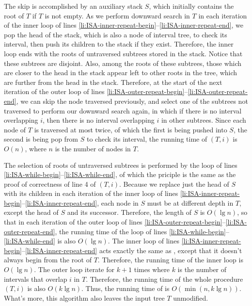\documentclass[a4paper, fleqn]{article}
\begin{document}
The skip is accomplished by an auxiliary stack $S$, which initially
contains the root of $T$ if $T$ is not empty. As we perform downward
search in $T$ in each iteration of the inner  loop of lines
\ref{li:ISA-inner-repeat-begin}--\ref{li:ISA-inner-repeat-end}, we pop
the head of the stack, which is also a node of interval tree, to check
its interval, then push its children to the stack if they
exist. Therefore, the inner  loop ends with the roots of
untraversed subtrees stored in the stack. Notice that these subtrees
are disjoint. Also, among the roots of these subtrees, those which are
closer to the head in the stack appear left to other roots in the
tree, which are further from the head in the stack. Therefore, at the
start of the next iteration of the outer  loop of lines
\ref{li:ISA-outer-repeat-begin}--\ref{li:ISA-outer-repeat-end}, we can
skip the node traversed previously, and select one of the subtrees not
traversed to perform our downward search again, in which if there is
no interval overlapping $i$, then there is no interval overlapping $i$
in other subtrees. Since each node of $T$ is traversed at most twice,
of which the first is being pushed into $S$, the second is being pop
from $S$ to check its interval, the running time of
$(T,i)$ is $O(n)$, where $n$ is the number
of nodes in $T$.

The selection of roots of untraversed subtrees is performed by the
 loop of lines
\ref{li:ISA-while-begin}--\ref{li:ISA-while-end}, of which the
priciple is the same as the proof of correctness of line 4 of
$(T,i)$. Because we replace just the head of $S$
with its children in each iteration of the inner  loop of
lines \ref{li:ISA-inner-repeat-begin}--\ref{li:ISA-inner-repeat-end},
each node in $S$ must be at different depth in $T$, except the head of
$S$ and its successor. Therefore, the length of $S$ is $O(\lg n)$, so
that in each iteration of the outer  loop of lines
\ref{li:ISA-outer-repeat-begin}--\ref{li:ISA-outer-repeat-end}, the
running time of the  loop of lines
\ref{li:ISA-while-begin}--\ref{li:ISA-while-end} is also $O(\lg
n)$. The inner  loop of lines
\ref{li:ISA-inner-repeat-begin}--\ref{li:ISA-inner-repeat-end} acts
exactly the same as , except that it doesn't
always begin from the root of $T$. Therefore, the running time of the
inner  loop is $O(\lg n)$. The outer  loop
iterate for $k+1$ times where $k$ is the number of intervals that
overlap $i$ in $T$. Therefore, the running time of the whole procedure
$(T,i)$ is also $O(k \lg n)$. Thus, the
running time of  is $O(\min(n, k \lg
n))$. What's more, this algorithm also leaves the input tree $T$
unmodified.
\end{document}
